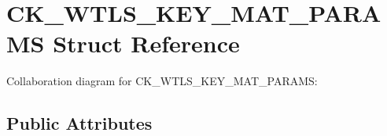 \hypertarget{struct_c_k___w_t_l_s___k_e_y___m_a_t___p_a_r_a_m_s}{}\section{C\+K\+\_\+\+W\+T\+L\+S\+\_\+\+K\+E\+Y\+\_\+\+M\+A\+T\+\_\+\+P\+A\+R\+A\+MS Struct Reference}
\label{struct_c_k___w_t_l_s___k_e_y___m_a_t___p_a_r_a_m_s}


Collaboration diagram for C\+K\+\_\+\+W\+T\+L\+S\+\_\+\+K\+E\+Y\+\_\+\+M\+A\+T\+\_\+\+P\+A\+R\+A\+MS\+:
\subsection*{Public Attributes}
